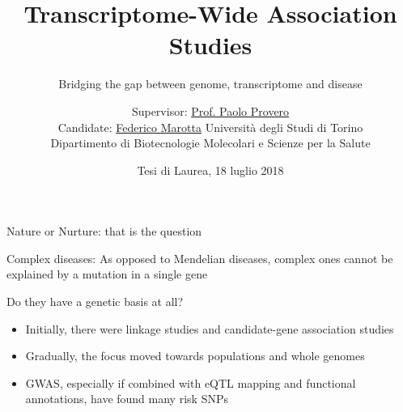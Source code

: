 \documentclass[aspectratio=169,12pt]{beamer}
\title{Transcriptome-Wide Association Studies}
\subtitle{\normalsize Bridging the gap between genome, transcriptome and 
disease}
\author[Federico Marotta]
{
	\footnotesize
	Supervisor: \href{mailto:paolo.provero@unito.it}{Prof. Paolo 
		Provero}
	\\
	Candidate: \href{mailto:federico.marotta@edu.unito.it}{Federico 
		Marotta}
	\vfill
	\scriptsize
	Università degli Studi di Torino
	\\
	Dipartimento di Biotecnologie Molecolari e Scienze per la Salute
	\vfill
}
\institute[UniTo, DBMSS]
{



}
\date{\tiny Tesi di Laurea, 18 luglio 2018}
\begin{document}
\maketitle


\begin{frame}{Nature or Nurture: that is the question}

	\bigskip

	\begin{block}{Complex diseases:}
		As opposed to Mendelian diseases, complex ones cannot be 
explained by a mutation in a single gene
	\end{block}

	\bigskip

	Do they have a genetic basis at all?

	\pause

	\begin{itemize}
		\item Initially, there were \alert{linkage studies} and 
			\alert{candidate-gene association studies}
		\item Gradually, the focus moved towards \alert{populations and 
				whole genomes}
		\item \alert{GWAS}, especially if combined with eQTL mapping and 
			functional annotations, have found many risk SNPs
	 \end{itemize}


\end{frame}
\end{document}
